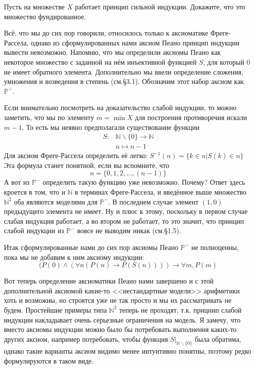 \begin{exercise}
Пусть на множестве $X$ работает принцип сильной индукции. Докажите, что это множество фундированное.
\end{exercise}

Всё, что мы до сих пор говорили, относилось только к аксиоматике Фреге-Рассела, однако из сформулированных нами аксиом Пеано принцип индукции вывести невозможно. Напомню, что мы определили аксиомы Пеано как некоторое множество с заданной на нём инъективной функцией $S$, для который 0 не имеет обратного элемента. Дополнительно мы ввели определение сложения, умножения и возведения в степень (см.\S3.1). Обозначим этот набор аксиом как $\mathbb{P}^-$.

Если внимательно посмотреть на доказательство слабой индукции, то можно заметить, что мы по элементу $m=\min X$ для построения противоречия искали  $m-1$. То есть мы неявно предполагали существование функции
\begin{align*}
S: & \mathbb{N}\backslash\{0\} \to \mathbb{N}\\
    & n \mapsto n-1
\end{align*}
Для аксиом Фреге-Рассела определить её легко:
$S^{-1}(n) = \{k \in n | S(k) \in n\}$
Эта формула станет понятной, если вы вспомните, что
$$n = \{0, 1, 2, \ldots, (n-1)\}$$
А вот из $\mathbb{P}^-$ определить такую функцию уже невозможно. Почему? Ответ здесь кроется в том, что и $\mathbb{N}$ в терминах Фреге-Рассела, и введённое выше множество $\mathbb{N}^2$ оба являются моделями для $\mathbb{P}^-$. В последнем случае элемент $(1, 0)$ предыдущего элемента не имеет. Ну и плюс к этому, поскольку в первом случае слабая индукция работает, а во втором не работает, то это значит, что принцип слабой индукции из $\mathbb{P}^-$ вовсе не выводим никак (см.\S1.5).

Итак сформулированные нами до сих пор аксиомы Пеано $\mathbb{P}^-$ не полноценны, пока мы не добавим к ним аксиому индукции:
$$(P(0)\land(\forall n (P(n)\to P(S(n)))) \to \forall m, P(m)$$

Вот теперь определение аксиоматики Пеано нами завершено и с этой дополнительной аксиомой какие-то <<нестандартные модели>> арифметики хоть и возможны, но строятся уже не так просто и мы их рассматривать не будем. Простейшие примеры типа $\mathbb{N}^2$ теперь не проходят, т.к. прицнип слабой индукции накладывает очень серьезные ограничения на модель. Я замечу, что вместо аксиомы индукции можно было бы потребовать выполнения каких-то других аксиом, например потребовать, чтобы функция $S|_{\mathbb{N}\backslash\{0\}}$ была обратима, однако такие варианты аксиом видимо менее интуитивно понятны, поэтому редко формулируются в таком виде.

